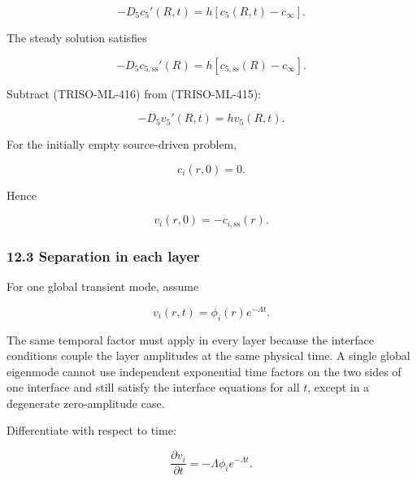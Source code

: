 \documentclass[11pt,a4paper]{article}
\begin{document}
\begin{equation}
-D_5c_5'(R,t)=h[c_5(R,t)-c_\infty].
\tag{TRISO-ML-415}
\label{eq:triso-ml-415}
\end{equation}

The steady solution satisfies

\begin{equation}
-D_5c_{5,\mathrm{ss}}'(R)
=
h[c_{5,\mathrm{ss}}(R)-c_\infty].
\tag{TRISO-ML-416}
\label{eq:triso-ml-416}
\end{equation}

Subtract (TRISO-ML-416) from (TRISO-ML-415):

\begin{equation}
\boxed{
-D_5v_5'(R,t)=hv_5(R,t).
}
\tag{TRISO-ML-417}
\label{eq:triso-ml-417}
\end{equation}

For the initially empty source-driven problem,

\begin{equation}
c_i(r,0)=0.
\tag{TRISO-ML-418}
\label{eq:triso-ml-418}
\end{equation}

Hence

\begin{equation}
\boxed{
v_i(r,0)
=
-c_{i,\mathrm{ss}}(r).
}
\tag{TRISO-ML-419}
\label{eq:triso-ml-419}
\end{equation}

\subsubsection*{12.3 Separation in each layer}

For one global transient mode, assume

\begin{equation}
v_i(r,t)
=
\phi_i(r)e^{-\Lambda t}.
\tag{TRISO-ML-420}
\label{eq:triso-ml-420}
\end{equation}

The same temporal factor must apply in every layer because the interface conditions couple the layer amplitudes at the same physical time. A single global eigenmode cannot use independent exponential time factors on the two sides of one interface and still satisfy the interface equations for all $t$, except in a degenerate zero-amplitude case.

Differentiate with respect to time:

\begin{equation}
\frac{\partial v_i}{\partial t}
=
-\Lambda\phi_i e^{-\Lambda t}.
\tag{TRISO-ML-421}
\label{eq:triso-ml-421}
\end{equation}
\end{document}

